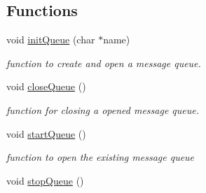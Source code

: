 \subsection*{Functions}
\begin{DoxyCompactItemize}
\item 
void \hyperlink{group__common_ga9790410c0c04ff25b6528a05bc7cead2}{init\-Queue} (char $\ast$name)
\begin{DoxyCompactList}\small\item\em function to create and open a message queue. \end{DoxyCompactList}\item 
\hypertarget{group__common_gaaed2ab22dc8d47e3ba08a790a08ee077}{void \hyperlink{group__common_gaaed2ab22dc8d47e3ba08a790a08ee077}{close\-Queue} ()}\label{group__common_gaaed2ab22dc8d47e3ba08a790a08ee077}

\begin{DoxyCompactList}\small\item\em function for closing a opened message queue. \end{DoxyCompactList}\item 
\hypertarget{group__common_ga81523db8833f6aec2a50db80ded427f0}{void \hyperlink{group__common_ga81523db8833f6aec2a50db80ded427f0}{start\-Queue} ()}\label{group__common_ga81523db8833f6aec2a50db80ded427f0}

\begin{DoxyCompactList}\small\item\em function to open the existing message queue \end{DoxyCompactList}\item 
\hypertarget{group__common_ga385d5e24598c06c159f03b1003d020cc}{void \hyperlink{group__common_ga385d5e24598c06c159f03b1003d020cc}{stop\-Queue} ()}\label{group__common_ga385d5e24598c06c159f03b1003d020cc}


\end{DoxyCompactItemize}
